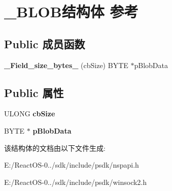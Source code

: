 \hypertarget{struct___b_l_o_b}{}\section{\+\_\+\+B\+L\+O\+B结构体 参考}
\label{struct___b_l_o_b}
\subsection*{Public 成员函数}
\begin{DoxyCompactItemize}
\item 
\mbox{\label{struct___b_l_o_b_adb16588c3be77f678cdac9a8e7452006}} 
{\bfseries \+\_\+\+Field\+\_\+size\+\_\+bytes\+\_\+} (cb\+Size) B\+Y\+TE $\ast$p\+Blob\+Data
\end{DoxyCompactItemize}
\subsection*{Public 属性}
\begin{DoxyCompactItemize}
\item 
\mbox{\label{struct___b_l_o_b_a05443031f56c0d76533fdd2a8572af40}} 
U\+L\+O\+NG {\bfseries cb\+Size}
\item 
\mbox{\label{struct___b_l_o_b_a6abc368ebe9768cafdf840a48befd088}} 
B\+Y\+TE $\ast$ {\bfseries p\+Blob\+Data}
\end{DoxyCompactItemize}


该结构体的文档由以下文件生成\+:\begin{DoxyCompactItemize}
\item 
E\+:/\+React\+O\+S-\/0../sdk/include/psdk/nspapi.\+h\item 
E\+:/\+React\+O\+S-\/0../sdk/include/psdk/winsock2.\+h\end{DoxyCompactItemize}
